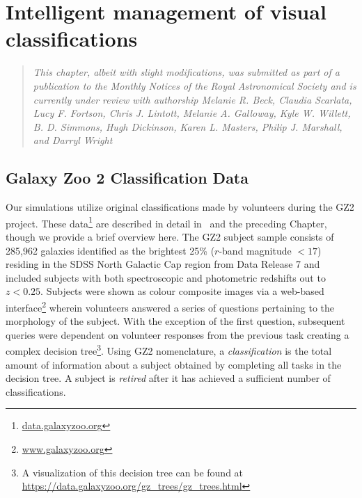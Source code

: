 
\chapter{Intelligent management of visual classifications}
\label{chap:3}

\begin{quote}
\emph{This chapter, albeit with slight modifications, was submitted as part of a publication to the Monthly Notices of the Royal Astronomical Society and is currently under review with authorship Melanie R. Beck, Claudia Scarlata, Lucy F. Fortson, Chris J. Lintott, Melanie A. Galloway, Kyle W. Willett, B. D. Simmons, Hugh Dickinson, Karen L. Masters, Philip J. Marshall, and Darryl Wright}\\
\end{quote}


\section{Galaxy Zoo 2 Classification Data} \label{chap3: data}

Our simulations utilize original classifications made by volunteers during the GZ2 project. These data\footnote{\url{data.galaxyzoo.org}} are described in detail in~\cite{Willett2013} and the preceding Chapter, though we provide a brief overview here.  The GZ2 subject sample consists of 285,962 galaxies identified as the brightest 25\% ($r$-band magnitude $< 17$) residing in the SDSS North Galactic Cap region from Data Release 7 and included subjects with both spectroscopic and photometric redshifts out to $z < 0.25$. Subjects were shown as colour composite images via a web-based interface\footnote{\url{www.galaxyzoo.org}} wherein volunteers answered a series of questions pertaining to the morphology of the subject. With the exception of the first question, subsequent queries were dependent on volunteer responses from the previous task creating a complex decision tree\footnote{A visualization of this decision tree can be found at \url{https://data.galaxyzoo.org/gz_trees/gz_trees.html}}. Using GZ2 nomenclature, a \textit{classification} is the total amount of information about a subject obtained by completing all tasks in the decision tree. A subject is \textit{retired} after it has achieved a sufficient number of classifications.



